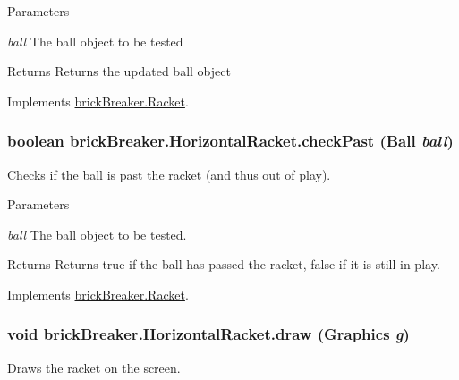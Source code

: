 \begin{DoxyParams}{Parameters}
\item[{\em ball}]The ball object to be tested \end{DoxyParams}
\begin{DoxyReturn}{Returns}
Returns the updated ball object 
\end{DoxyReturn}


Implements \hyperlink{classbrick_breaker_1_1_racket}{brickBreaker.Racket}.

\hypertarget{classbrick_breaker_1_1_horizontal_racket_a183d1d47f35fad74e603534ec74fbdb9}{
\subsubsection[{checkPast}]{\setlength{\rightskip}{0pt plus 5cm}boolean brickBreaker.HorizontalRacket.checkPast ({\bf Ball} {\em ball})}}
\label{classbrick_breaker_1_1_horizontal_racket_a183d1d47f35fad74e603534ec74fbdb9}
Checks if the ball is past the racket (and thus out of play).


\begin{DoxyParams}{Parameters}
\item[{\em ball}]The ball object to be tested. \end{DoxyParams}
\begin{DoxyReturn}{Returns}
Returns true if the ball has passed the racket, false if it is still in play. 
\end{DoxyReturn}


Implements \hyperlink{classbrick_breaker_1_1_racket}{brickBreaker.Racket}.

\hypertarget{classbrick_breaker_1_1_horizontal_racket_a8d97c411da71162acd5ecbb32c333f8d}{
\subsubsection[{draw}]{\setlength{\rightskip}{0pt plus 5cm}void brickBreaker.HorizontalRacket.draw (Graphics {\em g})}}
\label{classbrick_breaker_1_1_horizontal_racket_a8d97c411da71162acd5ecbb32c333f8d}
Draws the racket on the screen.


